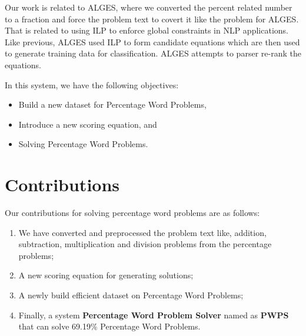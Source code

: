 \documentclass[document.tex]{subfiles}
\begin{document}
Our work is related to ALGES, where we converted the percent related number to a fraction and force the problem text to covert it like the problem for ALGES. That is related to using ILP to enforce global constraints in NLP applications\cite{24}. Like previous\cite{25, 26, 27, 28}, ALGES used ILP to form candidate equations which are then used to generate training data for classification. ALGES attempts to parser re-rank the equations\cite{29, 30}.

\noindent In this system, we have the following objectives:
\begin{itemize}
	\item Build a new dataset for Percentage Word Problems,
	\item Introduce a new scoring equation, and
	\item Solving Percentage Word Problems.
\end{itemize}

%
%

\section{Contributions}
\noindent Our contributions for solving percentage word problems are as follows: 
\begin{enumerate}
	\item We have converted and preprocessed the problem text like, addition, subtraction, multiplication and division problems from the percentage problems; 
	\item A new scoring equation for generating solutions;
	\item A newly build efficient dataset on Percentage Word Problems; 
	\item Finally, a system \textbf{Percentage Word Problem Solver} named as \textbf{PWPS} that can solve 69.19\% Percentage Word Problems.
\end{enumerate}
\end{document}

